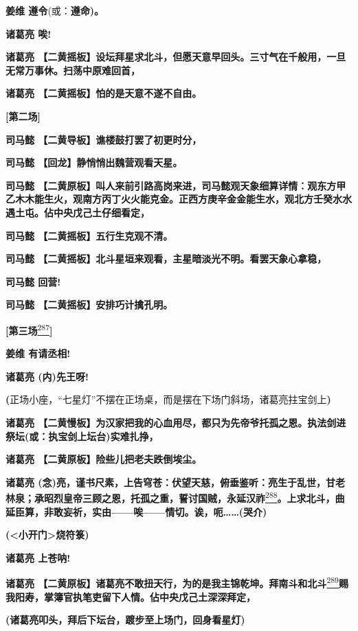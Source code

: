 \textbf{姜维 遵令}(或：\textbf{遵命)。}

\textbf{诸葛亮 唉!}

\textbf{诸葛亮
【二黄摇板】设坛拜星求北斗，但愿天意早回头。三寸气在千般用，一旦无常万事休。扫荡中原难回首，}

\textbf{诸葛亮 【二黄摇板】怕的是天意不遂不自由。}

\textbf{{[}第二场{]}}

\textbf{司马懿 【二黄导板】谯楼鼓打罢了初更时分，}

\textbf{司马懿 【回龙】静悄悄出魏营观看天星。}

\textbf{司马懿
【二黄原板】叫人来前引路高岗来进，司马懿观天象细算详情：观东方甲乙木木能生火，观南方丙丁火火能克金。正西方庚辛金金能生水，观北方壬癸水水遇土屯。佔中央戊己土仔细看定，}

\textbf{司马懿 【二黄摇板】五行生克观不清。}

\textbf{司马懿
【二黄摇板】北斗星垣来观看，主星暗淡光不明。看罢天象心拿稳，}

\textbf{司马懿 回营!}

\textbf{司马懿 【二黄摇板】安排巧计擒孔明。}

\textbf{{[}第三场}\protect\hyperlink{fn287}{\textsuperscript{287}}\textbf{{]}}

\textbf{姜维 有请丞相!}

\textbf{诸葛亮 (内)先王呀!}

\textbf{(}正场小座，``七星灯''不摆在正场桌，而是摆在下场门斜场，诸葛亮拄宝剑上\textbf{)}

\textbf{诸葛亮
【二黄慢板】为汉家把我的心血用尽，都只为先帝爷托孤之恩。执法剑进祭坛(或：执宝剑上坛台)实难扎挣，}

\textbf{诸葛亮 【二黄原板】险些儿把老夫跌倒埃尘。}

\textbf{诸葛亮
(念)亮，谨书尺素，上告穹苍：伏望天慈，俯垂鉴听：亮生于乱世，甘老林泉；承昭烈皇帝三顾之恩，托孤之重，誓讨国贼，永延汉祚}\protect\hyperlink{fn288}{\textsuperscript{288}}\textbf{。上求北斗，曲延臣算，非敢妄祈，实由------唉------情切。诶，呃\ldots{}\ldots{}(哭介)}

\textbf{(\textless{}小开门\textgreater{}烧符箓)}

\textbf{诸葛亮 上苍呐!}

\textbf{诸葛亮
【二黄原板】诸葛亮不敢扭天行，为的是我主锦乾坤。拜南斗和北斗}\protect\hyperlink{fn289}{\textsuperscript{289}}\textbf{赐我阳寿，掌簿官执笔吏留下人情。佔中央戊己土深深拜定，}

\textbf{(诸葛亮叩头，拜后下坛台，踱步至上场门，回身看星灯)}

